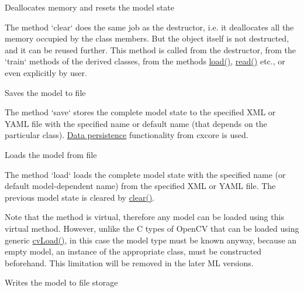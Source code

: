 
Deallocates memory and resets the model state


The method `clear` does the same job as the destructor, i.e. it deallocates all the memory occupied by the class members. But the object itself is not destructed, and it can be reused further. This method is called from the destructor, from the `train` methods of the derived classes, from the methods \href{#CvStatModel.3A.3Aload}{load()}, \href{#CvStatModel.3A.3Aread}{read()} etc., or even explicitly by user.



Saves the model to file


The method `save` stores the complete model state to the specified XML or YAML file with the specified name or default name (that depends on the particular class). \href{opencvref_cxcore.htm#cxcore_persistence}{Data persistence} functionality from cxcore is used.



Loads the model from file


The method `load` loads the complete model state with the specified name (or default model-dependent name) from the specified XML or YAML file. The previous model state is cleared by \href{#CvStatModel.3A.3Aclear}{clear()}.

Note that the method is virtual, therefore any model can be loaded using this virtual method. However, unlike the C types of OpenCV that can be loaded using generic \href{opencvref_cxcore.htm#decl_cvLoad}{cvLoad()}, in this case the model type must be known anyway, because an empty model, an instance of the appropriate class, must be constructed beforehand. This limitation will be removed in the later ML versions.



Writes the model to file storage

